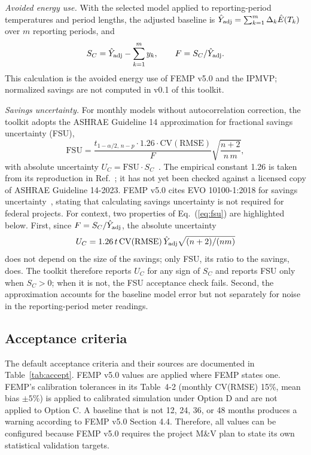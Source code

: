 \documentclass[10pt,twocolumn,letterpaper]{article}
\begin{document}
\emph{Avoided energy use.} With the selected model applied to reporting-period temperatures and period lengths, the adjusted baseline is $\hat Y_{\rm adj}=\sum_{k=1}^{m}\Delta_k\hat E(T_k)$ over $m$ reporting periods, and
\begin{equation}
S_C=\hat Y_{\rm adj}-\sum_{k=1}^{m}y_k,\qquad F=S_C/\hat Y_{\rm adj}.
\label{eq:avoided}
\end{equation}
This calculation is the avoided energy use of FEMP v5.0 and the IPMVP; normalized savings are not computed in v0.1 of this toolkit.

\emph{Savings uncertainty.}\label{sec:fsu} For monthly models without autocorrelation correction, the toolkit adopts the ASHRAE Guideline 14 approximation for fractional savings uncertainty (FSU),
\begin{equation}
\mathrm{FSU} = \frac{t_{1-\alpha/2,\,n-p}\cdot 1.26\cdot \mathrm{CV(RMSE)}}{F}\sqrt{\frac{n+2}{n\,m}},
\label{eq:fsu}
\end{equation}
with absolute uncertainty $U_C=\mathrm{FSU}\cdot S_C$~\cite{reddy2000,ashrae14}. The empirical constant 1.26 is taken from its reproduction in Ref.~\cite{gallagher2018}; it has not yet been checked against a licensed copy of ASHRAE Guideline 14-2023. FEMP v5.0 cites EVO 10100-1:2018 for savings uncertainty~\cite{evo_uncertainty}, stating that calculating savings uncertainty is not required for federal projects. For context, two properties of Eq.~(\ref{eq:fsu}) are highlighted below. First, since $F=S_C/\hat Y_{\rm adj}$, the absolute uncertainty
\begin{equation}
U_C = 1.26\,t\,\mathrm{CV(RMSE)}\,\hat Y_{\rm adj}\sqrt{(n+2)/(nm)}
\label{eq:uc}
\end{equation}
does not depend on the size of the savings; only FSU, its ratio to the savings, does. The toolkit therefore reports $U_C$ for any sign of $S_C$ and reports FSU only when $S_C>0$; when it is not, the FSU acceptance check fails. Second, the approximation accounts for the baseline model error but not separately for noise in the reporting-period meter readings.

\subsection{Acceptance criteria}

The default acceptance criteria and their sources are documented in Table~\ref{tab:accept}. FEMP v5.0 values are applied where FEMP states one. FEMP's calibration tolerances in its Table~4-2 (monthly CV(RMSE) 15\%, mean bias $\pm5$\%) is applied to calibrated simulation under Option D and are not applied to Option C. A baseline that is not 12, 24, 36, or 48 months produces a warning according to FEMP v5.0 Section 4.4. Therefore, all values can be configured because FEMP v5.0 requires the project M\&V plan to state its own statistical validation targets.
\end{document}
